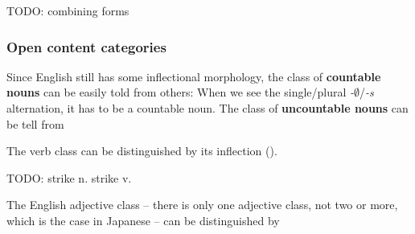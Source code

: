 \documentclass[UTF8, a4paper, oneside, scheme=plain]{ctexrep}
\newcommand*{\citepage}[1]{p.~{#1}}
\newcommand*{\concept}[1]{\textbf{#1}}
\newcommand{\corpus}[1]{\emph{#1}}
\newcommand{\emptymorpheme}{$\emptyset$}
\begin{document}
TODO: combining forms \citep[\citepage{1661}]{cgel}

\subsubsection{Open content categories}

Since English still has some inflectional morphology,
the class of \concept{countable nouns} can be easily told from others:
When we see the single/plural \corpus{-\emptymorpheme}/\corpus{-s} alternation, it has to be a countable noun.
The class of \concept{uncountable nouns} can be tell from 

The verb class can be distinguished by its inflection (). 

TODO: strike n. strike v.

The English adjective class -- there is only one adjective class, not two or more,
which is the case in Japanese -- 
can be distinguished by 
\end{document}
